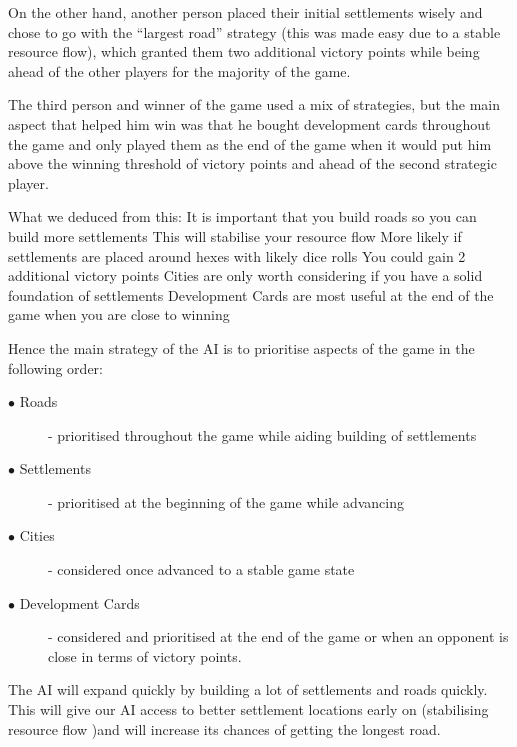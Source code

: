 \documentclass[a4paper,doc]{apa6}
\begin{document}
On the other hand, another person placed their initial settlements wisely and chose to go with the “largest road” strategy (this was made easy due to a stable resource flow), which granted them two additional victory points while being ahead of the other players for the majority of the game.

The third person and winner of the game used a mix of strategies, but the main aspect that helped him win was that he bought development cards throughout the game and only played them as the end of the game when it would put him above the winning threshold of victory points and ahead of the second strategic player.

What we deduced from this:
It is important that you build roads so you can build more settlements 
This will stabilise your resource flow 
More likely if settlements are placed around hexes with likely dice rolls
You could gain 2 additional victory points
Cities are only worth considering if you have a solid foundation of settlements
Development Cards are most useful at the end of the game when you are close to winning

Hence the main strategy of the AI is to prioritise aspects of the game in the following order:

\begin{description}
\item[$\bullet$ Roads] - prioritised throughout the game while aiding building of settlements
\item[$\bullet$ Settlements] - prioritised at the beginning of the game while advancing
\item[$\bullet$ Cities] - considered once advanced to a stable game state 
\item[$\bullet$ Development Cards] - considered and prioritised at the end of the game or when an opponent is close in terms of victory points.
\end{description}

The AI will expand quickly by building a lot of settlements and roads quickly. This will give our AI access to better settlement locations early on (stabilising resource flow )and will increase its chances of getting the longest road. 
\end{document}
